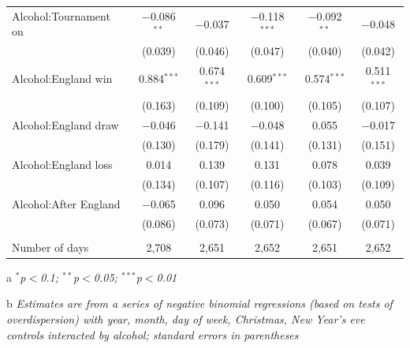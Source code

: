 \documentclass[12pt, letterpaper]{article}
\begin{document}
\begin{table}[htp]
{\begin{threeparttable}
\begin{tabular}{@{\extracolsep{5pt}}lccccc}
  Alcohol:Tournament on & $-$0.086$^{**}$ & $-$0.037 & $-$0.118$^{***}$ & $-$0.092$^{**}$ & $-$0.048 \\ 
  & (0.039) & (0.046) & (0.047) & (0.040) & (0.042) \\ 
  Alcohol:England win & 0.884$^{***}$ & 0.674$^{***}$ & 0.609$^{***}$ & 0.574$^{***}$ & 0.511$^{***}$ \\ 
  & (0.163) & (0.109) & (0.100) & (0.105) & (0.107) \\ 
  Alcohol:England draw & $-$0.046 & $-$0.141 & $-$0.048 & 0.055 & $-$0.017 \\ 
  & (0.130) & (0.179) & (0.141) & (0.131) & (0.151) \\ 
  Alcohol:England loss & 0.014 & 0.139 & 0.131 & 0.078 & 0.039 \\ 
  & (0.134) & (0.107) & (0.116) & (0.103) & (0.109) \\ 
  Alcohol:After England & $-$0.065 & 0.096 & 0.050 & 0.054 & 0.050 \\ 
  & (0.086) & (0.073) & (0.071) & (0.067) & (0.071) \\ 
 \hline \\[-1.8ex] 
Number of days & 2,708 & 2,651 & 2,652 & 2,651 & 2,652 \\ 
\hline 

\end{tabular}
\begin{tablenotes}
      \item[a] \textit{$^{*}$p$<$0.1; $^{**}$p$<$0.05; $^{***}$p$<$0.01}
      \item[b] \textit{Estimates are from a series of negative binomial regressions (based on tests of overdispersion)  with year, month, day of week, Christmas, New Year's eve controls interacted by alcohol; standard errors in parentheses}
    \end{tablenotes}
\end{threeparttable} } 
\end{table}
\end{document}
